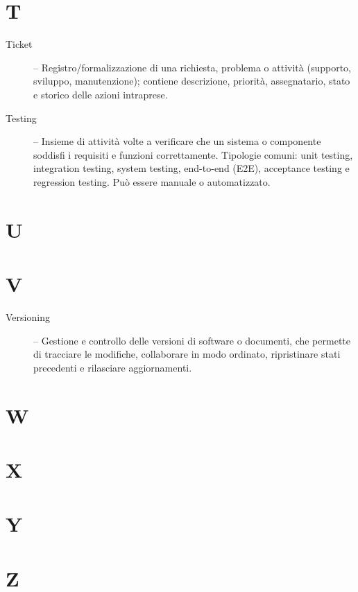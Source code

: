 \section*{T}
\begin{description}
    \item[Ticket] -- Registro/formalizzazione di una richiesta, problema o attività (supporto, sviluppo, manutenzione); contiene descrizione, priorità, assegnatario, stato e storico delle azioni intraprese.
    \item[Testing] -- Insieme di attività volte a verificare che un sistema o componente soddisfi i requisiti e funzioni correttamente. Tipologie comuni: unit testing, integration testing, system testing, end-to-end (E2E), acceptance testing e regression testing. Può essere manuale o automatizzato.
\end{description}

\section*{U}



\section*{V}
\begin{description}
    \item[Versioning] -- Gestione e controllo delle versioni di software o documenti, che permette di tracciare le modifiche, collaborare in modo ordinato, ripristinare stati precedenti e rilasciare aggiornamenti.
\end{description}


\section*{W}


\section*{X}


\section*{Y}


\section*{Z}
